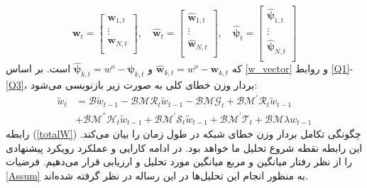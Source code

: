 \begin{equation}
	\boldsymbol{w}_t=\begin{bmatrix}
		\boldsymbol{w}_{1,t} \\
		\vdots\\
		\boldsymbol{w}_{N,t}\\		
	\end{bmatrix},\quad
	\boldsymbol{\hat{w}}_t=\begin{bmatrix}
		\boldsymbol{\hat{w}}_{1,t} \\
		\vdots\\
		\boldsymbol{\hat{w}}_{N,t}\\		
	\end{bmatrix},\quad
	\boldsymbol{\hat{\psi}}_t=\begin{bmatrix}
		\boldsymbol{\hat{\psi}}_{1,t} \\
		\vdots\\
		\boldsymbol{\hat{\psi}}_{N,t}\\		
	\end{bmatrix}
\end{equation}
که $\hat{\boldsymbol{w}}_{k,t}=w^o-\boldsymbol{w}_{k,t}$ و $\hat{\boldsymbol{\psi}}_{k,t}=w^o-\boldsymbol{\psi}_{k,t}$ است.
بر اساس \ref{w_vector} و روابط \ref{Q1}-\ref{Q3}، بردار وزن خطای کلی به صورت زیر بازنویسی می‌شود:
\begin{equation}\label{totalW}
	\begin{split}
		\tilde{w}_t &= \mathcal{B} \tilde{w}_{t-1}-\mathcal{B}\mathcal{M}\mathcal{R}_t \tilde{w}_{t-1}-\mathcal{B}\mathcal{M} \mathcal{G}_t+ \mathcal{B}\mathcal{M}^{'} \mathcal{R}_t \tilde{w}_{t-1}\\
		&+ \mathcal{B}\mathcal{M}^{''} \mathcal{H}_t \tilde{w}_{t-1} + \mathcal{B}\mathcal{M}^{'} \mathcal{S}_t \tilde{w}_{t-1} +\mathcal{B}\mathcal{M}^{'} \mathcal{T}_t + \mathcal{B}\mathcal{M}\lambda w
		_{t-1}
	\end{split}
\end{equation}
رابطه (\ref{totalW}) چگونگی تکامل بردار وزن خطای شبکه در طول زمان را بیان می‌کند. این رابطه نقطه شروع تحلیل ما خواهد بود. در ادامه کارایی و عملکرد رویکرد پیشنهادی را از نظر رفتار میانگین و مربع میانگین مورد تحلیل و ارزیابی قرار می‌دهیم. فرضیات \ref{Assum} به منظور انجام این تحلیل‌ها در این رساله در نظر گرفته شده‌اند. 


